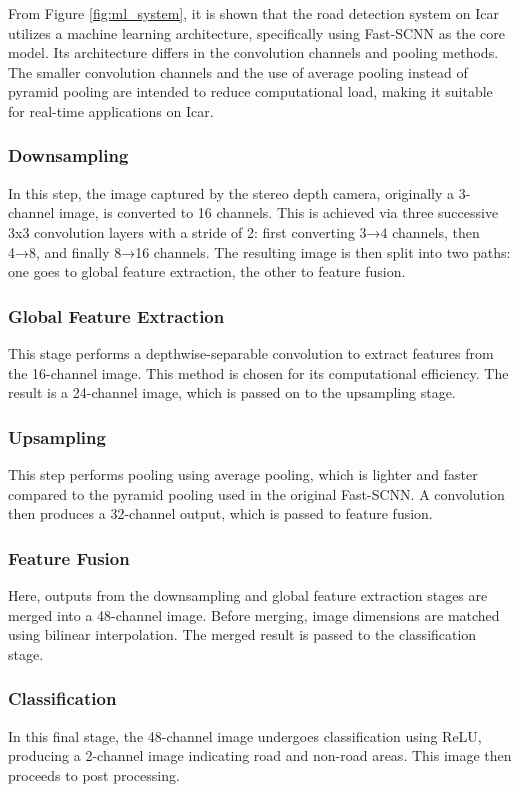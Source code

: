 \documentclass[conference]{IEEEtran}
\begin{document}
From Figure \ref{fig:ml_system}, it is shown that the road detection system on Icar utilizes a machine learning architecture, specifically using Fast-SCNN \cite{ref_fast_scnn} as the core model. Its architecture differs in the convolution channels and pooling methods. The smaller convolution channels and the use of average pooling instead of pyramid pooling are intended to reduce computational load, making it suitable for real-time applications on Icar.

\subsubsection{Downsampling} 
In this step, the image captured by the stereo depth camera, originally a 3-channel image, is converted to 16 channels. This is achieved via three successive 3x3 convolution layers with a stride of 2: first converting 3→4 channels, then 4→8, and finally 8→16 channels. The resulting image is then split into two paths: one goes to global feature extraction, the other to feature fusion.

\subsubsection{Global Feature Extraction}
This stage performs a depthwise-separable convolution to extract features from the 16-channel image. This method is chosen for its computational efficiency. The result is a 24-channel image, which is passed on to the upsampling stage.

\subsubsection{Upsampling}
This step performs pooling using average pooling, which is lighter and faster compared to the pyramid pooling used in the original Fast-SCNN. A convolution then produces a 32-channel output, which is passed to feature fusion.

\subsubsection{Feature Fusion}
Here, outputs from the downsampling and global feature extraction stages are merged into a 48-channel image. Before merging, image dimensions are matched using bilinear interpolation. The merged result is passed to the classification stage.

\subsubsection{Classification}
In this final stage, the 48-channel image undergoes classification using ReLU, producing a 2-channel image indicating road and non-road areas. This image then proceeds to post processing.
\end{document}
